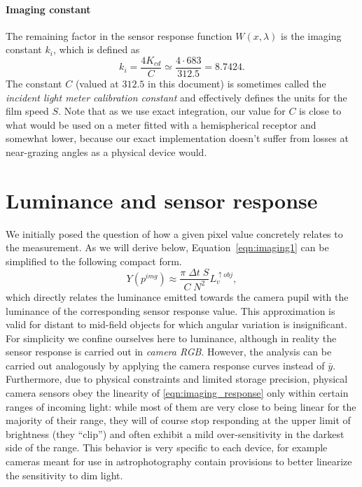 \paragraph{Imaging constant}

The remaining factor in the sensor response function $W(x,\lambda)$ is the
imaging constant $k_i$, which is defined as
\begin{equation}\label{eqn:imaging_ki}
 k_i = \frac{4K_{cd}}{C} \simeq \frac{4\cdot683}{312.5} = 8.7424.
\end{equation}
The constant $C$ (valued at $312.5$ in this document) is sometimes called the \textsl{incident light meter
calibration constant} and effectively defines the units for the \gls{film speed} $S$.
Note that as we use exact integration, our value for $C$ is close to what would be used on a meter fitted with a hemispherical receptor and somewhat lower, because our exact implementation doesn't suffer from losses at near-grazing angles as a physical device would.


\section{Luminance and sensor response}

We initially posed the question of how a given pixel value concretely
relates to the measurement. As we will derive below,
Equation~\eqref{eqn:imaging1} can be simplified to the following
compact form.
\begin{equation}\label{eqn:imaging_response}
  Y(p^{img}) \approx \frac{ \pi\;\Delta t\;S}{C\; N^2} L_v^{\uparrow obj},
\end{equation}
which directly relates the luminance emitted towards the camera pupil
with the luminance of the corresponding sensor response value. This approximation
is valid for distant to mid-field objects for which angular variation
is insignificant. For simplicity we confine ourselves here to luminance, although in
reality the sensor response is carried out in \textit{camera RGB}. However, the
analysis can be carried out analogously by applying the camera
response curves instead of $\bar y$. Furthermore, due to physical
constraints and limited storage precision, physical camera sensors
obey the linearity of \eqref{eqn:imaging_response} only within certain
ranges of incoming light: while most of them are very close to being linear for the
majority of their range, they will of course stop responding at the upper limit of 
brightness (they ``clip'') and often exhibit a mild over-sensitivity in the darkest 
side of the range. This behavior is very specific to each device, 
for example cameras meant for use in astrophotography contain provisions 
to better linearize the sensitivity to dim light.

